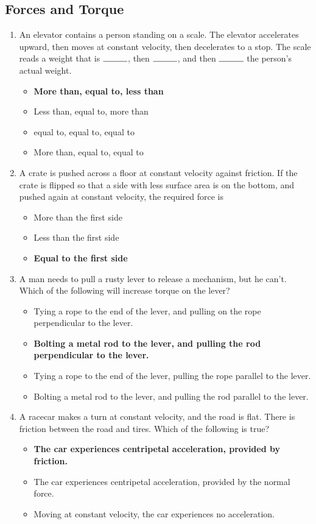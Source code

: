 \documentclass[10pt]{article}
\begin{document}
\subsection{Forces and Torque}
\begin{enumerate}
\item An elevator contains a person standing on a scale.  The elevator accelerates upward, then moves at constant velocity, then decelerates to a stop.  The scale reads a weight that is $\rule{1cm}{0.15mm}$, then $\rule{1cm}{0.15mm}$, and then $\rule{1cm}{0.15mm}$ the person's actual weight.
\begin{itemize}
\item \textbf{More than, equal to, less than}
\item Less than, equal to, more than
\item equal to, equal to, equal to
\item More than, equal to, equal to
\end{itemize}
\clearpage
\item A crate is pushed across a floor at constant velocity against friction.  If the crate is flipped so that a side with less surface area is on the bottom, and pushed again at constant velocity, the required force is
\begin{itemize}
\item More than the first side
\item Less than the first side
\item \textbf{Equal to the first side}
\end{itemize}
\item A man needs to pull a rusty lever to release a mechanism, but he can't.  Which of the following will increase torque on the lever?
\begin{itemize}
\item Tying a rope to the end of the lever, and pulling on the rope perpendicular to the lever.
\item \textbf{Bolting a metal rod to the lever, and pulling the rod perpendicular to the lever.}
\item Tying a rope to the end of the lever, pulling the rope parallel to the lever.
\item Bolting a metal rod to the lever, and pulling the rod parallel to the lever.
\end{itemize}
\item A racecar makes a turn at constant velocity, and the road is flat.  There is friction between the road and tires.  Which of the following is true?
\begin{itemize}
\item \textbf{The car experiences centripetal acceleration, provided by friction.}
\item The car experiences centripetal acceleration, provided by the normal force.
\item Moving at constant velocity, the car experiences no acceleration.
\end{itemize}
\end{enumerate}
\end{document}

